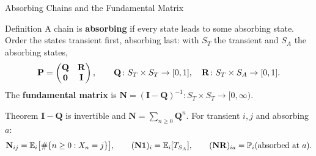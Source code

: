 \begin{frame}{Absorbing Chains and the Fundamental Matrix}
  \label{fr:absorbing}
  \small
  \begin{block}{Definition}
    A chain is \textbf{absorbing} if every state leads to some absorbing state. Order the states transient first, absorbing last: with $S_T$ the transient and $S_A$ the absorbing states,
    \[
      \mathbf{P}=\begin{pmatrix}\mathbf Q&\mathbf R\\ \mathbf 0&\mathbf I\end{pmatrix},\qquad
      \mathbf Q\colon S_T\times S_T\to[0,1],\quad \mathbf R\colon S_T\times S_A\to[0,1].
    \]
    The \textbf{fundamental matrix} is $\mathbf N=(\mathbf I-\mathbf Q)^{-1}\colon S_T\times S_T\to[0,\infty)$.
  \end{block}
  \begin{block}{Theorem}
    $\mathbf I-\mathbf Q$ is invertible and $\mathbf N=\sum_{n\ge0}\mathbf Q^n$. For transient $i,j$ and absorbing $a$:
    \[
      \mathbf N_{ij}=\mathbb{E}_i\big[\#\{n\ge0 : X_n=j\}\big],\qquad
      (\mathbf N\mathbf 1)_i=\mathbb{E}_i[T_{S_A}],\qquad
      (\mathbf N\mathbf R)_{ia}=\mathbb{P}_i(\text{absorbed at } a).
    \]
  \end{block}
\end{frame}

